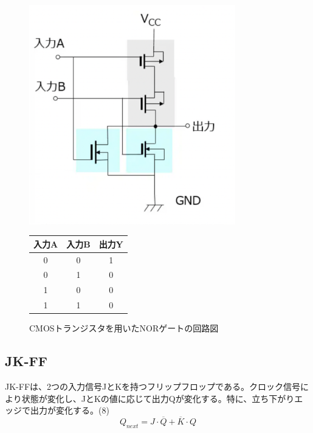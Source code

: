 \documentclass{jlreq}
\numberwithin{equation}{section}
\begin{document}
\begin{figure}[H]
  \centering
  \begin{minipage}{0.45\textwidth}
    \centering
    \includegraphics[width=0.8\textwidth]{assets/nor.png}
    \caption{CMOSトランジスタを用いたNORゲートの回路図}
    \label{fig:nor_gate}
  \end{minipage}
  \hfill
  \begin{minipage}{0.45\textwidth}
    \centering
    \label{tab:nor_truth_table}
    \begin{tabular}{|c|c|c|}
      \hline
      入力A & 入力B & 出力Y \\ \hline
      0     & 0     & 1     \\ \hline
      0     & 1     & 0     \\ \hline
      1     & 0     & 0     \\ \hline
      1     & 1     & 0     \\ \hline
    \end{tabular}
  \end{minipage}
\end{figure}

\subsection{JK-FF}
JK-FFは、2つの入力信号JとKを持つフリップフロップである。クロック信号により状態が変化し、JとKの値に応じて出力Qが変化する。特に、立ち下がりエッジで出力が変化する。(8)
\begin{equation}
  Q_{next} = J \cdot \overline{Q} + \overline{K} \cdot Q
\end{equation}
\end{document}
